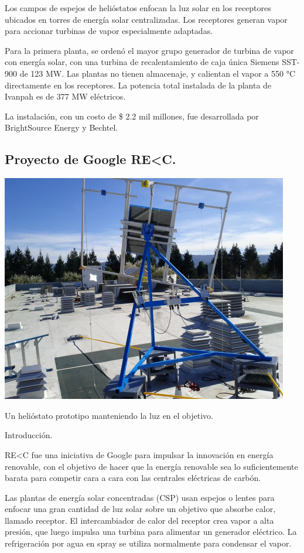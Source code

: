Los campos de espejos de helióstatos enfocan la luz solar en los receptores ubicados en torres de energía solar centralizadas. Los receptores generan vapor para accionar turbinas de vapor especialmente adaptadas.
 
Para la primera planta, se ordenó el mayor grupo generador de turbina de vapor con energía solar, con una turbina de recalentamiento de caja única Siemens SST-900 de 123 MW. Las plantas no tienen almacenaje, y calientan el vapor a 550 °C directamente en los receptores. La potencia total instalada de la planta de Ivanpah es de 377 MW eléctricos.
 
La instalación, con un costo de \$ 2.2 mil millones, fue desarrollada por BrightSource Energy y Bechtel. \cite{Wikipedia2WebSite}



\subsection{Proyecto de Google RE\textless C.}

\includegraphics[scale=1]{HeliostatoGoogle.png}

Un helióstato prototipo manteniendo la luz en el objetivo. \cite{Wikipedia3WebSite}

Introducción.

RE\textless C fue una iniciativa de Google para impulsar la innovación en energía renovable, con el objetivo de hacer que la energía renovable sea lo suficientemente barata para competir cara a cara con las centrales eléctricas de carbón.

Las plantas de energía solar concentradas (CSP) usan espejos o lentes para enfocar una gran cantidad de luz solar sobre un objetivo que absorbe calor, llamado receptor. El intercambiador de calor del receptor crea vapor a alta presión, que luego impulsa una turbina para alimentar un generador eléctrico. La refrigeración por agua en spray se utiliza normalmente para condensar el vapor.

